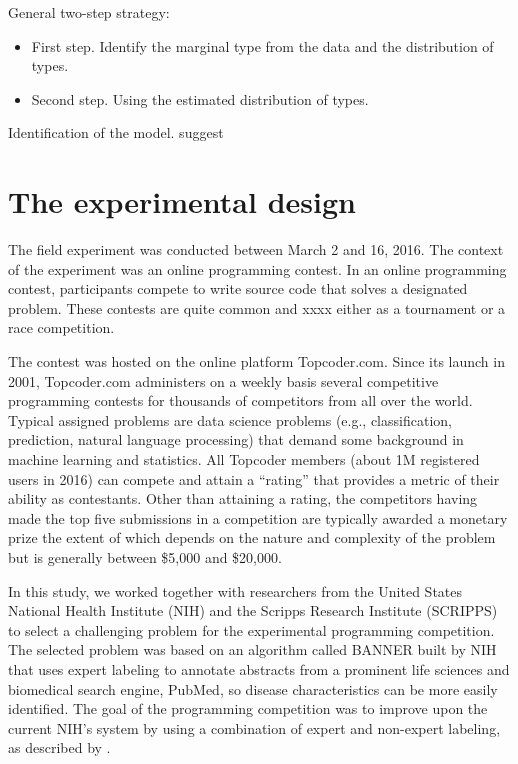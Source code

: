 \documentclass[12pt,]{article}
\begin{document}
General two-step strategy:

\begin{itemize}
\item
  First step. Identify the marginal type from the data and the
  distribution of types.
\item
  Second step. Using the estimated distribution of types.
\end{itemize}

Identification of the model. suggest

\section{The experimental design}\label{the-experimental-design}

The field experiment was conducted between March 2 and 16, 2016. The
context of the experiment was an online programming contest. In an
online programming contest, participants compete to write source code
that solves a designated problem. These contests are quite common and
xxxx either as a tournament or a race competition.

The contest was hosted on the online platform Topcoder.com. Since its
launch in 2001, Topcoder.com administers on a weekly basis several
competitive programming contests for thousands of competitors from all
over the world. Typical assigned problems are data science problems
(e.g., classification, prediction, natural language processing) that
demand some background in machine learning and statistics. All Topcoder
members (about 1M registered users in 2016) can compete and attain a
``rating'' that provides a metric of their ability as contestants. Other
than attaining a rating, the competitors having made the top five
submissions in a competition are typically awarded a monetary prize the
extent of which depends on the nature and complexity of the problem but
is generally between \$5,000 and \$20,000.

In this study, we worked together with researchers from the United
States National Health Institute (NIH) and the Scripps Research
Institute (SCRIPPS) to select a challenging problem for the experimental
programming competition. The selected problem was based on an algorithm
called BANNER built by NIH \citep{leaman2008banner} that uses expert
labeling to annotate abstracts from a prominent life sciences and
biomedical search engine, PubMed, so disease characteristics can be more
easily identified. The goal of the programming competition was to
improve upon the current NIH's system by using a combination of expert
and non-expert labeling, as described by \citet{good2014microtask}.
\end{document}
